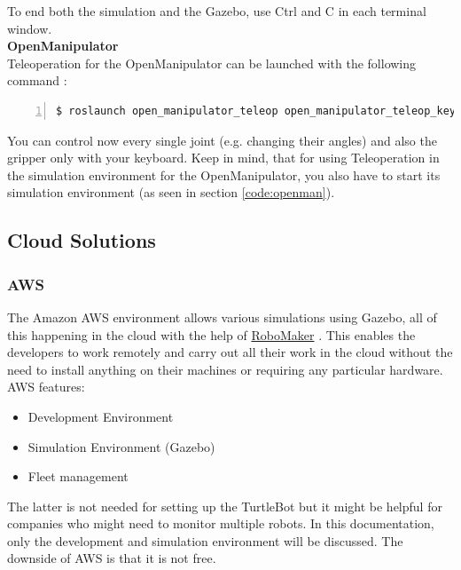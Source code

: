 \documentclass[plainarticle,zihtitle,english,final,hyperref,utf8]{zihpub}
\begin{document}
To end both the simulation and the Gazebo, use Ctrl and C in each terminal window.\\
\newline
\textbf{OpenManipulator}\\
\newline
Teleoperation for the OpenManipulator can be launched with the following command \cite{openmanipulatorteleop}:
\begin{Verbatim}[breaklines=true, breakanywhere=true, baselinestretch=1,fontsize=\scriptsize,numbers=left,frame=single,stepnumber=5,xleftmargin=1cm,xrightmargin=1cm]
$ roslaunch open_manipulator_teleop open_manipulator_teleop_keyboard.launch
    \end{Verbatim}

You can control now every single joint (e.g. changing their angles) and also the gripper only with your keyboard. Keep in mind, that for using Teleoperation in the simulation environment for the OpenManipulator, you also have to start its simulation environment (as seen in section \ref{code:openman}).

\newpage 
\subsection{Cloud Solutions}
\subsubsection{AWS}
\label{sec:aws}
The Amazon AWS environment allows various simulations using Gazebo, all of this happening in the cloud with the help of \href{https://aws.amazon.com/de/robomaker/}{RoboMaker} \cite{robomaker}. This enables the developers to work remotely and carry out all their work in the cloud without the need to install anything on their machines or requiring any particular hardware. \\
\newline
AWS features:
\begin{itemize}
    \item Development Environment
    \item Simulation Environment (Gazebo)
    \item Fleet management
\end{itemize}
The latter is not needed for setting up the TurtleBot but it might be helpful for companies who might need to monitor multiple robots.
In this documentation, only the development and simulation environment will be discussed.
The downside of AWS is that it is not free.\\
\newline
\end{document}

